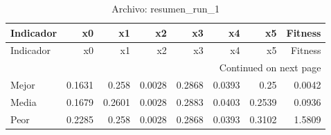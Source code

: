 \begin{longtable}{lrrrrrrr}
\caption{Archivo: resumen\_run\_1}\label{tab:resumen_run_1} \\
\toprule
Indicador & x0 & x1 & x2 & x3 & x4 & x5 & Fitness \\
\midrule
\endfirsthead
\toprule
Indicador & x0 & x1 & x2 & x3 & x4 & x5 & Fitness \\
\midrule
\endhead
\midrule
\multicolumn{8}{r}{Continued on next page} \\
\midrule
\endfoot
\bottomrule
\endlastfoot
Mejor & 0.1631 & 0.258 & 0.0028 & 0.2868 & 0.0393 & 0.25 & 0.0042 \\
Media & 0.1679 & 0.2601 & 0.0028 & 0.2883 & 0.0403 & 0.2539 & 0.0936 \\
Peor & 0.2285 & 0.258 & 0.0028 & 0.2868 & 0.0393 & 0.3102 & 1.5809 \\
\end{longtable}
